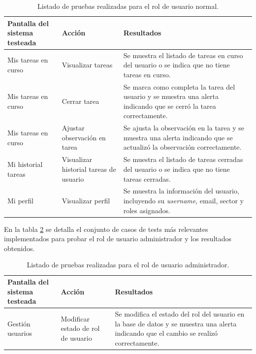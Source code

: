 \begin{table}[h]
	\centering
	\caption[Tipos de pruebas sistema para el rol de usuario normal]{Listado de pruebas realizadas para el rol de usuario normal.}
	\begin{tabular}{ p{3.5cm} p{2.5cm} p{7cm}}

		\toprule
		\textbf{Pantalla del sistema testeada} & 
		\textbf{Acción} & 
		\textbf{Resultados} 
		\\
		\midrule
Mis tareas en curso  & Visualizar tareas  & Se muestra el listado de tareas en curso del usuario o se indica que no tiene tareas en curso. \\
Mis tareas en curso & Cerrar tarea  & Se marca como completa la tarea del usuario y se muestra una alerta indicando que se cerró la tarea correctamente.  \\
Mis tareas en curso & Ajustar observación en tarea  & Se ajusta la observación en la tarea y se muestra una alerta indicando que se actualizó la observación correctamente. \\
Mi historial tareas & Visualizar historial tareas de usuario & Se muestra el listado de tareas cerradas del usuario o se indica que no tiene tareas cerradas. \\
Mi perfil & Visualizar perfil & Se muestra la información del usuario, incluyendo su \textit{username}, email, sector y roles asignados. \\

		\bottomrule
		\hline
	\end{tabular}
	\label{tab:tablaTestsSistemaUsuNormal}
\end{table}


En la tabla  \ref{tab:tablaTestsSistemaUsuAdmin} se detalla el conjunto de casos de tests más relevantes implementados para probar el rol de usuario administrador y los resultados obtenidos. 

\begin{table}[h]
	\centering
	\caption[Tipos de pruebas sistema para el rol de usuario administrador]{Listado de pruebas realizadas para el rol de usuario administrador.}
	\begin{tabular}{ p{3.5cm} p{2.5cm} p{7cm}} 	

		\toprule
		\textbf{Pantalla del sistema testeada} & 
		\textbf{Acción} & 
		\textbf{Resultados} 
		\\
		\midrule
Gestión usuarios & Modificar estado de rol de usuario  & Se modifica el estado del rol del usuario en la base de datos y se muestra una alerta indicando que el cambio se realizó correctamente.  \\
		\bottomrule
		\hline
	\end{tabular}
	\label{tab:tablaTestsSistemaUsuAdmin}
\end{table}

